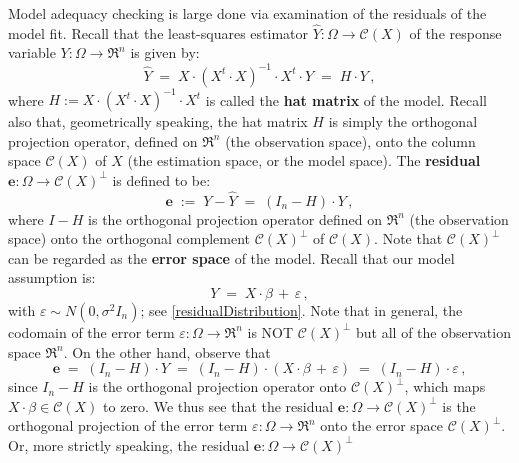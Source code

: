 \documentclass{article}
\begin{document}
Model adequacy checking is large done via examination of the residuals of the model fit.
Recall that the least-squares estimator $\widehat{Y}  : \Omega \longrightarrow \mathcal{C}(X)$
of the response variable $Y : \Omega \longrightarrow \Re^{n}$
is given by:
\begin{equation*}
\widehat{Y} \; = \; X\cdot\left(X^{t}\cdot X\right)^{-1}\cdot X^{t} \cdot Y \; = \; H \cdot Y\,,
\end{equation*}
where $H := X\cdot\left(X^{t}\cdot X\right)^{-1}\cdot X^{t}$ is called the \textbf{hat matrix}
of the model. Recall also that, geometrically speaking, the hat matrix $H$ is simply the orthogonal
projection operator, defined on $\Re^{n}$ (the observation space), onto the column space
$\mathcal{C}(X)$ of $X$ (the estimation space, or the model space).
The \textbf{residual} $\mathbf{e} : \Omega \longrightarrow \mathcal{C}(X)^{\perp}$ is defined to be:
\begin{equation*}
\mathbf{e}
\; := \; Y - \widehat{Y}
\;  = \; \left(I_{n} - H\right) \cdot Y\,,
\end{equation*}
where $I - H$ is the orthogonal projection operator defined on $\Re^{n}$ (the observation space)
onto the orthogonal complement $\mathcal{C}(X)^{\perp}$ of $\mathcal{C}(X)$.
Note that $\mathcal{C}(X)^{\perp}$ can be regarded as the \textbf{error space} of the model.
Recall that our model assumption is:
\begin{equation*}
Y \; = \; X\cdot\beta \, + \, \varepsilon\,,
\end{equation*}
with $\varepsilon \sim N\!\left(0,\sigma^{2}I_{n}\right)$; see \eqref{residualDistribution}.
Note that in general, the codomain of the error term $\varepsilon : \Omega \longrightarrow \Re^{n}$
is NOT $\mathcal{C}(X)^{\perp}$ but all of the observation space $\Re^{n}$.
On the other hand, observe that
\begin{equation*}
\mathbf{e}
\; = \; \left(I_{n} - H\right)\cdot Y 
\; = \; \left(I_{n} - H\right)\cdot \left(X\cdot\beta \, + \, \varepsilon\right)
\; = \; \left(I_{n} - H\right)\cdot \varepsilon\,,
\end{equation*}
since $I_{n} - H$ is the orthogonal projection operator onto $\mathcal{C}(X)^{\perp}$, which maps
$X\cdot\beta \in \mathcal{C}(X)$ to zero.
We thus see that the residual $\mathbf{e} : \Omega \longrightarrow \mathcal{C}(X)^{\perp}$ is the
orthogonal projection of the error term $\varepsilon : \Omega \longrightarrow \Re^{n}$ onto the
error space $\mathcal{C}(X)^{\perp}$.
Or, more strictly speaking, the residual $\mathbf{e} : \Omega \longrightarrow \mathcal{C}(X)^{\perp}$
\end{document}
